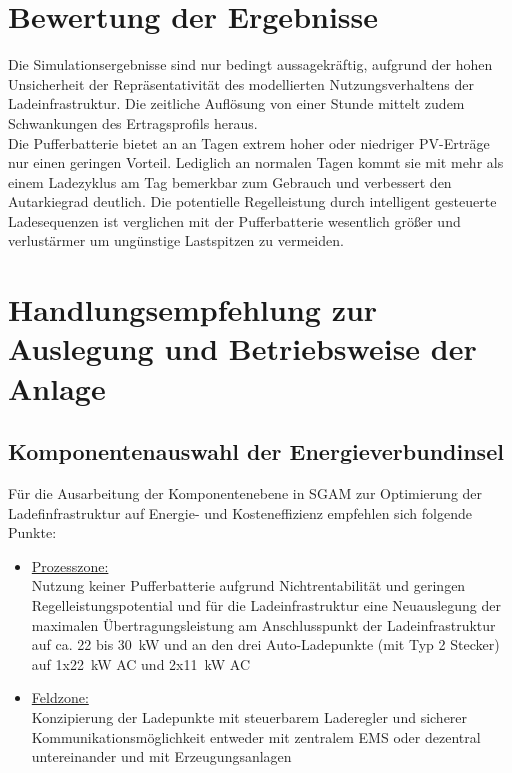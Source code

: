\section{Bewertung der Ergebnisse}
	\label{Kap:Simulation_conclusion}
	Die Simulationsergebnisse sind nur bedingt aussagekräftig, aufgrund der hohen Unsicherheit der Repräsentativität des modellierten Nutzungsverhaltens der Ladeinfrastruktur. Die zeitliche Auflösung von einer Stunde mittelt zudem Schwankungen des Ertragsprofils heraus. \\
    
	Die Pufferbatterie bietet an an Tagen extrem hoher oder niedriger PV-Erträge nur einen geringen Vorteil. Lediglich an normalen Tagen kommt sie mit mehr als einem Ladezyklus am Tag bemerkbar zum Gebrauch und verbessert den Autarkiegrad deutlich. Die potentielle Regelleistung durch intelligent gesteuerte Ladesequenzen ist verglichen mit der Pufferbatterie wesentlich größer und verlustärmer um ungünstige Lastspitzen zu vermeiden. \\    
    
\section{Handlungsempfehlung zur Auslegung und Betriebsweise der Anlage}
\label{Kap:Advice}
\subsection{Komponentenauswahl der Energieverbundinsel}
	Für die Ausarbeitung der Komponentenebene in SGAM zur Optimierung der Ladefinfrastruktur auf Energie- und Kosteneffizienz empfehlen sich folgende Punkte:
    \begin{itemize}
    	\item \underline{Prozesszone:}\\
        	Nutzung keiner Pufferbatterie aufgrund Nichtrentabilität und geringen Regelleistungspotential und für die Ladeinfrastruktur eine Neuauslegung der maximalen Übertragungsleistung am Anschlusspunkt der Ladeinfrastruktur auf ca. 22 bis 30~kW und an den drei Auto-Ladepunkte (mit Typ 2 Stecker) auf 1x22~kW AC und 2x11~kW AC  
        \item \underline{Feldzone:} \\
        	Konzipierung der Ladepunkte mit steuerbarem Laderegler und sicherer Kommunikationsmöglichkeit entweder mit zentralem EMS oder dezentral untereinander und mit Erzeugungsanlagen
	\end{itemize} 

